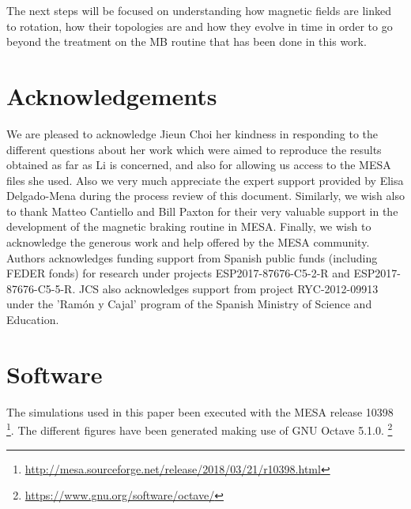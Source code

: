 \documentclass[fleqn,usenatbib]{mnras}
\begin{document}
The next steps will be focused on understanding how magnetic fields are linked to rotation, how their topologies are and how they evolve in time in order to go beyond the treatment on the MB routine that has been done in this work.\par



\section*{Acknowledgements}
We are pleased to acknowledge Jieun Choi her kindness in responding to the different questions about her work which were aimed to reproduce the results obtained as far as Li is concerned, and also for allowing us access to the MESA files she used. Also we very much appreciate the expert support provided by Elisa Delgado-Mena during the process review of this document. Similarly, we wish also to thank Matteo Cantiello and Bill Paxton for their very valuable support in the development of the magnetic braking routine in MESA. Finally, we wish to acknowledge the generous work and help offered by the MESA community. Authors acknowledges funding support from Spanish public funds (including FEDER fonds) for research under projects ESP2017-87676-C5-2-R and ESP2017-87676-C5-5-R. JCS also acknowledges support from project RYC-2012-09913 under the 'Ram\'on y Cajal' program of the Spanish Ministry of Science and Education.

\section*{Software}
The simulations used in this paper been executed with the MESA release 10398 \footnote{\url{http://mesa.sourceforge.net/release/2018/03/21/r10398.html}}. The different figures have been generated making use of GNU Octave 5.1.0. \footnote{\url{https://www.gnu.org/software/octave/}} 








\end{document}
